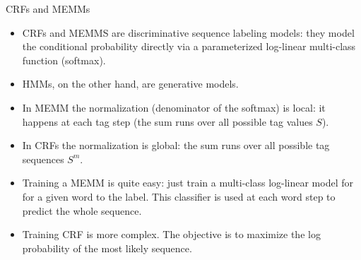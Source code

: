 \documentclass[handout]{beamer}
\begin{document}
\begin{frame}{CRFs and MEMMs}
\begin{scriptsize}

\begin{itemize}

\item CRFs and MEMMS are discriminative sequence labeling models: they model the conditional probability directly via a parameterized log-linear multi-class function (softmax).

\item HMMs, on the other hand, are generative models.

\item In MEMM the normalization (denominator of the softmax) is local: it happens at each tag step (the sum runs over all possible tag values $S$).

\item In CRFs the normalization is global: the sum runs over all possible tag sequences $S^m$.

\item Training a MEMM is quite easy: just train a multi-class log-linear model for for a given word to the label. This classifier is used at each word step to predict the whole sequence.

\item Training CRF is more complex. The objective  is to maximize the log probability of the most likely sequence.


\end{itemize}

\end{scriptsize}
\end{frame}
\end{document}

